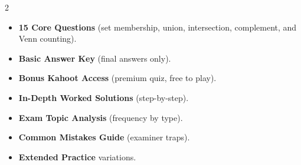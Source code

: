 \documentclass[11pt,a4paper]{article}
\newcommand{\FullReleaseDate}{April 30, 2026}
\begin{document}
\vspace{8pt}

\begin{multicols}{2}
  \begin{tcolorbox}[card, title=\sffamily\bfseries\textcolor{white}{\faHandPointDown\ TODAY (Simplified Version)}, colbacktitle=mainblue, boxed title style={sharp corners, boxrule=0pt}]
    \begin{itemize}[leftmargin=1.2em, itemsep=2pt]
      \item \small \textbf{15 Core Questions} (set membership, union, intersection, complement, and Venn counting).
      \item \small \textbf{Basic Answer Key} (final answers only).
      \item \small \textbf{Bonus Kahoot Access} (premium quiz, free to play).
    \end{itemize}
  \end{tcolorbox}

  \columnbreak

  \begin{tcolorbox}[card, title=\sffamily\bfseries\textcolor{white}{\faRocket\ ON \FullReleaseDate\ (Full Upgrade)}, colbacktitle=mainblue, boxed title style={sharp corners, boxrule=0pt}]
    \begin{itemize}[leftmargin=1.2em, itemsep=2pt]
      \item \small \textbf{In-Depth Worked Solutions} (step-by-step).
      \item \small \textbf{Exam Topic Analysis} (frequency by type).
      \item \small \textbf{Common Mistakes Guide} (examiner traps).
      \item \small \textbf{Extended Practice} variations.
    \end{itemize}
  \end{tcolorbox}
\end{multicols}
\end{document}
